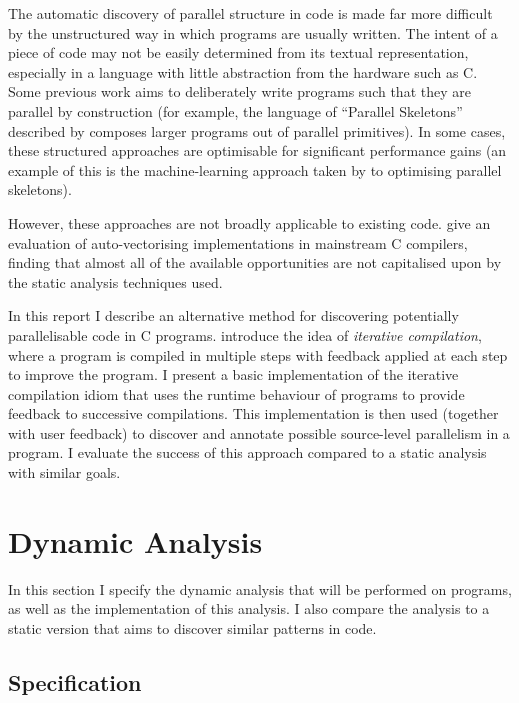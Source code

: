 \documentclass[journal]{IEEEtran}
\begin{document}
The automatic discovery of parallel structure in code is made far more difficult
by the unstructured way in which programs are usually written.  The intent of a
piece of code may not be easily determined from its textual representation,
especially in a language with little abstraction from the hardware such as C.
Some previous work aims to deliberately write programs such that they are
parallel by construction (for example, the language of ``Parallel Skeletons''
described by \textcite{gorlatch_parallel_2011} composes larger programs out of
parallel primitives). In some cases, these structured approaches are optimisable
for significant performance gains (an example of this is the machine-learning
approach taken by \textcite{collins_masif:_2013} to optimising parallel
skeletons).

However, these approaches are not broadly applicable to existing code.
\textcite{maleki_evaluation_2011} give an evaluation of auto-vectorising
implementations in mainstream C compilers, finding that almost all of the
available opportunities are not capitalised upon by the static analysis
techniques used.

In this report I describe an alternative method for discovering potentially
parallelisable code in C programs. \textcite{fursin_evaluating_2002} introduce
the idea of \emph{iterative compilation}, where a program is compiled in
multiple steps with feedback applied at each step to improve the program. I
present a basic implementation of the iterative compilation idiom that uses the
runtime behaviour of programs to provide feedback to successive compilations.
This implementation is then used (together with user feedback) to discover and
annotate possible source-level parallelism in a program. I evaluate the success
of this approach compared to a static analysis with similar goals.

\section{Dynamic Analysis} \label{sec:dynamic}

In this section I specify the dynamic analysis that will be performed on
programs, as well as the implementation of this analysis. I also compare the
analysis to a static version that aims to discover similar patterns in code.

\subsection{Specification} \label{ssec:spec}
\end{document}

